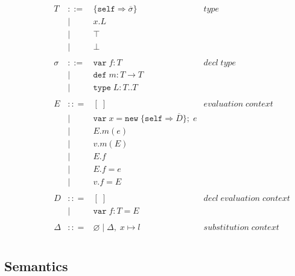 \documentclass{llncs}
\begin{document}
\[\begin{array}{lll}
\begin{array}{lllr}
\end{array}
& ~~~~~~
&
\begin{array}{lllr}
T & ::= & \{\texttt{self} \Rightarrow \overline{\sigma}\} & type \\
& | & x.L &\\
& | & \top & \\
& | & \bot & \\
&&\\
\sigma & ::= & \texttt{var} \; f:T & decl \; type\\
       & |   & \texttt{def} \; m:T \rightarrow T \\
		 & |   & \texttt{type} \; L : T .. T &\\
&&\\
E & :: = & [\;] & evaluation \; context \\
       & | & \texttt{var} \; x = \texttt{new} \; \{\texttt{self} \Rightarrow \overline{D}\}; \; e& \\
       & | & E.m(e)\\
       & | & v.m(E)\\
       & | & E.f\\
       & | & E.f = e\\
       & | & v.f = E\\
&&\\
D & :: = & [\;] & decl \; evaluation \; context \\
       & | & \texttt{var} \; f : T = E\\
&&\\
\Delta & :: = & \varnothing \; | \; \Delta,\; x \mapsto l & substitution \; context \\
\end{array}
\end{array}
\]

\subsection{Semantics}







\end{document}
